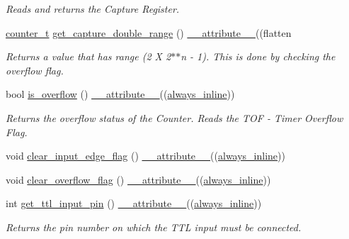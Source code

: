 \begin{DoxyCompactItemize}
\begin{DoxyCompactList}\small\item\em Reads and returns the Capture Register. \end{DoxyCompactList}\item 
\hyperlink{types_8hpp_ac89ac912f524b3e3fa3720ea55fec966}{counter\+\_\+t} \hyperlink{classTMR1Controller_a34042b5a735d4f8fd40fa36135bdec8c}{get\+\_\+capture\+\_\+double\+\_\+range} () \hyperlink{utilities_8hpp_a103d5b3998e0dd804213c8f30a094f4d}{\+\_\+\+\_\+attribute\+\_\+\+\_\+}((flatten
\begin{DoxyCompactList}\small\item\em Returns a value that has range (2 X 2$\ast$$\ast$n -\/ 1). This is done by checking the overflow flag. \end{DoxyCompactList}\item 
bool \hyperlink{classTMR1Controller_a06052b4a881156be3c7a4b6495d8ca11}{is\+\_\+overflow} () \hyperlink{utilities_8hpp_a103d5b3998e0dd804213c8f30a094f4d}{\+\_\+\+\_\+attribute\+\_\+\+\_\+}((\hyperlink{classTMR1Controller_adce8e8a496510485a88ccc5b88595672}{always\+\_\+inline}))
\begin{DoxyCompactList}\small\item\em Returns the overflow status of the Counter. Reads the T\+OF -\/ Timer Overflow Flag. \end{DoxyCompactList}\item 
void \hyperlink{classTMR1Controller_aa59afefa545098e53cb2e0560142526c}{clear\+\_\+input\+\_\+edge\+\_\+flag} () \hyperlink{utilities_8hpp_a103d5b3998e0dd804213c8f30a094f4d}{\+\_\+\+\_\+attribute\+\_\+\+\_\+}((\hyperlink{classTMR1Controller_adce8e8a496510485a88ccc5b88595672}{always\+\_\+inline}))
\item 
void \hyperlink{classTMR1Controller_a7117e12d0cb8ec32aa6552fe541023da}{clear\+\_\+overflow\+\_\+flag} () \hyperlink{utilities_8hpp_a103d5b3998e0dd804213c8f30a094f4d}{\+\_\+\+\_\+attribute\+\_\+\+\_\+}((\hyperlink{classTMR1Controller_adce8e8a496510485a88ccc5b88595672}{always\+\_\+inline}))
\item 
int \hyperlink{classTMR1Controller_a084c153e1a888f72456c54b29e3fa957}{get\+\_\+ttl\+\_\+input\+\_\+pin} () \hyperlink{utilities_8hpp_a103d5b3998e0dd804213c8f30a094f4d}{\+\_\+\+\_\+attribute\+\_\+\+\_\+}((\hyperlink{classTMR1Controller_adce8e8a496510485a88ccc5b88595672}{always\+\_\+inline}))
\begin{DoxyCompactList}\small\item\em Returns the pin number on which the T\+TL input must be connected. \end{DoxyCompactList}\item 

\end{DoxyCompactItemize}
